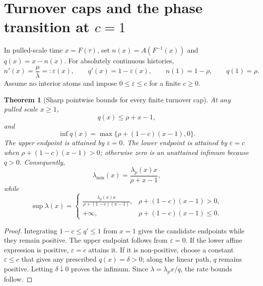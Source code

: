 \documentclass[11pt]{article}
\newtheorem{theorem}{Theorem}
\theoremstyle{definition}
\begin{document}
\section{Turnover caps and the phase transition at \texorpdfstring{$c=1$}{c=1}}
In pulled-scale time $x=F(\tau)$, set $n(x)=A(F^{-1}(x))$ and $q(x)=x-n(x)$. For absolutely continuous histories,
\begin{equation}
 n'(x)=\frac{\mu}{\lambda}=: \varepsilon(x),\qquad
 q'(x)=1-\varepsilon(x),\qquad n(1)=1-\rho,\qquad q(1)=\rho. \label{eq:turnover}
\end{equation}
Assume no interior atoms and impose $0\leq\varepsilon\leq c$ for a finite $c\geq0$.

\begin{theorem}[Sharp pointwise bounds for every finite turnover cap]\label{thm:cap}
At any pulled scale $x\geq1$,
\begin{equation}
 q(x)\leq\rho+x-1, \label{eq:qupper}
\end{equation}
and
\begin{equation}
 \inf q(x)=\max\{\rho+(1-c)(x-1),0\}. \label{eq:qinf}
\end{equation}
The upper endpoint is attained by $\varepsilon=0$. The lower endpoint is attained by $\varepsilon=c$ when $\rho+(1-c)(x-1)>0$; otherwise zero is an unattained infimum because $q>0$. Consequently,
\begin{equation}
 \lambda_{\min}(x)=\frac{\lambda_p(x)x}{\rho+x-1}, \label{eq:lmin}
\end{equation}
while
\begin{equation}
 \sup\lambda(x)=
 \begin{cases}
 \displaystyle\frac{\lambda_p(x)x}{\rho+(1-c)(x-1)},&\rho+(1-c)(x-1)>0,\\[6pt]
 +\infty,&\rho+(1-c)(x-1)\leq0.
 \end{cases} \label{eq:lsup}
\end{equation}
\end{theorem}

\begin{proof}
Integrating $1-c\leq q'\leq1$ from $x=1$ gives the candidate endpoints while they remain positive. The upper endpoint follows from $\varepsilon=0$. If the lower affine expression is positive, $\varepsilon=c$ attains it. If it is non-positive, choose a constant $\varepsilon\leq c$ that gives any prescribed $q(x)=\delta>0$; along the linear path, $q$ remains positive. Letting $\delta\downarrow0$ proves the infimum. Since $\lambda=\lambda_px/q$, the rate bounds follow.
\end{proof}
\end{document}
